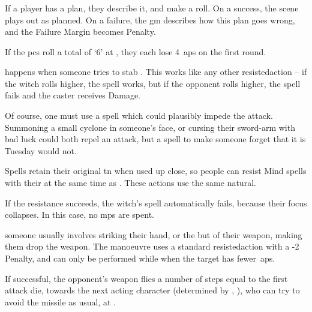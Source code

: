\begin{multicols}{2}
\subsubsection{}

If a player has a plan, they describe it, and make a roll.
On a success, the scene plays out as planned.
On a failure, the \gls{gm} describes how this plan goes wrong, and the Failure Margin becomes  Penalty.

\begin{exampletext}
  If the \glspl{pc} roll a total of `6' at \tn[10], they each lose 4~\glspl{ap} on the first \gls{round}.
\end{exampletext}

happens when someone tries to stab .
This works like any other \gls{resistedaction} -- if the \gls{witch} rolls higher, the spell works, but if the opponent rolls higher, the spell fails and the caster receives Damage.

{}

Of course, one must use a spell which could plausibly impede the attack.
Summoning a small cyclone in someone's face, or cursing their sword-arm with bad luck could both repel an attack, but a spell to make someone forget that it is Tuesday would not.

Spells retain their original \gls{tn} when used up close, so people can resist Mind spells with their  at the same time as .
These actions use the same \gls{natural}.

If the  resistance succeeds, the \gls{witch}'s spell automatically fails, because their focus collapses.
In this case, no \glspl{mp} are spent.

someone usually involves striking their hand, or the but of their weapon, making them drop the weapon.
The manoeuvre uses a standard  \gls{resistedaction} with a -2 Penalty, and can only be performed while when the target has fewer~\glspl{ap}.

If successful, the opponent's weapon flies a number of \glspl{step} equal to the first attack die, towards the next acting character (determined by , ), who can try to avoid the missile as usual, at \tn[12].


\end{multicols}
